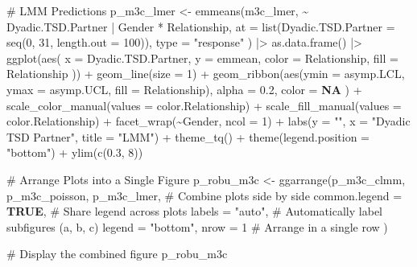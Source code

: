 \documentclass[
  bookmarksnumbered]{article}
\newenvironment{Shaded}{\begin{snugshade}}{\end{snugshade}}
\newcommand{\AttributeTok}[1]{\textcolor[rgb]{0.80,0.80,0.80}{#1}}
\newcommand{\CommentTok}[1]{\textcolor[rgb]{0.50,0.62,0.50}{#1}}
\newcommand{\ConstantTok}[1]{\textcolor[rgb]{0.86,0.64,0.64}{\textbf{#1}}}
\newcommand{\DecValTok}[1]{\textcolor[rgb]{0.86,0.86,0.80}{#1}}
\newcommand{\FloatTok}[1]{\textcolor[rgb]{0.75,0.75,0.82}{#1}}
\newcommand{\FunctionTok}[1]{\textcolor[rgb]{0.94,0.94,0.56}{#1}}
\newcommand{\NormalTok}[1]{\textcolor[rgb]{0.80,0.80,0.80}{#1}}
\newcommand{\OtherTok}[1]{\textcolor[rgb]{0.94,0.94,0.56}{#1}}
\newcommand{\SpecialCharTok}[1]{\textcolor[rgb]{0.86,0.64,0.64}{#1}}
\newcommand{\StringTok}[1]{\textcolor[rgb]{0.80,0.58,0.58}{#1}}
\begin{document}
\begin{Shaded}
\begin{Highlighting}[]
\CommentTok{\# LMM Predictions}
\NormalTok{p\_m3c\_lmer }\OtherTok{\textless{}{-}} \FunctionTok{emmeans}\NormalTok{(m3c\_lmer, }\SpecialCharTok{\textasciitilde{}}\NormalTok{ Dyadic.TSD.Partner }\SpecialCharTok{|}\NormalTok{ Gender }\SpecialCharTok{*}\NormalTok{ Relationship,}
  \AttributeTok{at =} \FunctionTok{list}\NormalTok{(}\AttributeTok{Dyadic.TSD.Partner =} \FunctionTok{seq}\NormalTok{(}\DecValTok{0}\NormalTok{, }\DecValTok{31}\NormalTok{, }\AttributeTok{length.out =} \DecValTok{100}\NormalTok{)),}
  \AttributeTok{type =} \StringTok{"response"}
\NormalTok{) }\SpecialCharTok{|\textgreater{}}
  \FunctionTok{as.data.frame}\NormalTok{() }\SpecialCharTok{|\textgreater{}}
  \FunctionTok{ggplot}\NormalTok{(}\FunctionTok{aes}\NormalTok{(}
    \AttributeTok{x =}\NormalTok{ Dyadic.TSD.Partner, }\AttributeTok{y =}\NormalTok{ emmean,}
    \AttributeTok{color =}\NormalTok{ Relationship, }\AttributeTok{fill =}\NormalTok{ Relationship}
\NormalTok{  )) }\SpecialCharTok{+}
  \FunctionTok{geom\_line}\NormalTok{(}\AttributeTok{size =} \DecValTok{1}\NormalTok{) }\SpecialCharTok{+}
  \FunctionTok{geom\_ribbon}\NormalTok{(}\FunctionTok{aes}\NormalTok{(}\AttributeTok{ymin =}\NormalTok{ asymp.LCL, }\AttributeTok{ymax =}\NormalTok{ asymp.UCL, }\AttributeTok{fill =}\NormalTok{ Relationship),}
    \AttributeTok{alpha =} \FloatTok{0.2}\NormalTok{, }\AttributeTok{color =} \ConstantTok{NA}
\NormalTok{  ) }\SpecialCharTok{+}
  \FunctionTok{scale\_color\_manual}\NormalTok{(}\AttributeTok{values =}\NormalTok{ color.Relationship) }\SpecialCharTok{+}
  \FunctionTok{scale\_fill\_manual}\NormalTok{(}\AttributeTok{values =}\NormalTok{ color.Relationship) }\SpecialCharTok{+}
  \FunctionTok{facet\_wrap}\NormalTok{(}\SpecialCharTok{\textasciitilde{}}\NormalTok{Gender, }\AttributeTok{ncol =} \DecValTok{1}\NormalTok{) }\SpecialCharTok{+}
  \FunctionTok{labs}\NormalTok{(}\AttributeTok{y =} \StringTok{""}\NormalTok{, }\AttributeTok{x =} \StringTok{"Dyadic TSD Partner"}\NormalTok{, }\AttributeTok{title =} \StringTok{"LMM"}\NormalTok{) }\SpecialCharTok{+}
  \FunctionTok{theme\_tq}\NormalTok{() }\SpecialCharTok{+}
  \FunctionTok{theme}\NormalTok{(}\AttributeTok{legend.position =} \StringTok{"bottom"}\NormalTok{) }\SpecialCharTok{+}
  \FunctionTok{ylim}\NormalTok{(}\FunctionTok{c}\NormalTok{(}\FloatTok{0.3}\NormalTok{, }\DecValTok{8}\NormalTok{))}

\CommentTok{\# Arrange Plots into a Single Figure}
\NormalTok{p\_robu\_m3c }\OtherTok{\textless{}{-}} \FunctionTok{ggarrange}\NormalTok{(p\_m3c\_clmm, p\_m3c\_poisson, p\_m3c\_lmer, }\CommentTok{\# Combine plots side by side}
  \AttributeTok{common.legend =} \ConstantTok{TRUE}\NormalTok{, }\CommentTok{\# Share legend across plots}
  \AttributeTok{labels =} \StringTok{"auto"}\NormalTok{, }\CommentTok{\# Automatically label subfigures (a, b, c)}
  \AttributeTok{legend =} \StringTok{"bottom"}\NormalTok{,}
  \AttributeTok{nrow =} \DecValTok{1} \CommentTok{\# Arrange in a single row}
\NormalTok{)}

\CommentTok{\# Display the combined figure}
\NormalTok{p\_robu\_m3c}
\end{Highlighting}
\end{Shaded}
\end{document}
